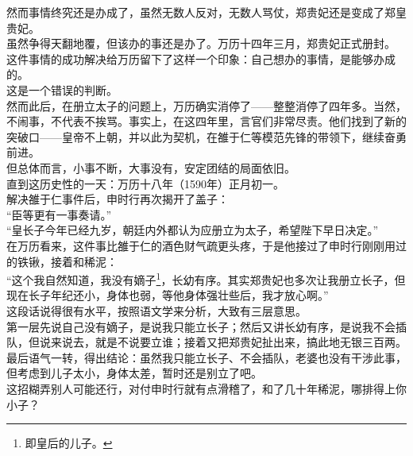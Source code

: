 \begin{multicols}{\theparacolNo}
然而事情终究还是办成了，虽然无数人反对，无数人骂仗，郑贵妃还是变成了郑皇贵妃。\\

虽然争得天翻地覆，但该办的事还是办了。万历十四年三月，郑贵妃正式册封。\\

这件事情的成功解决给万历留下了这样一个印象：自己想办的事情，是能够办成的。\\

这是一个错误的判断。\\

然而此后，在册立太子的问题上，万历确实消停了——整整消停了四年多。当然，不闹事，不代表不挨骂。事实上，在这四年里，言官们非常尽责。他们找到了新的突破口——皇帝不上朝，并以此为契机，在雒于仁等模范先锋的带领下，继续奋勇前进。\\

但总体而言，小事不断，大事没有，安定团结的局面依旧。\\

直到这历史性的一天：万历十八年（1590年）正月初一。\\

解决雒于仁事件后，申时行再次揭开了盖子：\\

“臣等更有一事奏请。”\\

“皇长子今年已经九岁，朝廷内外都认为应册立为太子，希望陛下早日决定。”\\

在万历看来，这件事比雒于仁的酒色财气疏更头疼，于是他接过了申时行刚刚用过的铁锹，接着和稀泥：\\

“这个我自然知道，我没有嫡子\footnote{即皇后的儿子。}，长幼有序。其实郑贵妃也多次让我册立长子，但现在长子年纪还小，身体也弱，等他身体强壮些后，我才放心啊。”\\

这段话说得很有水平，按照语文学来分析，大致有三层意思。\\

第一层先说自己没有嫡子，是说我只能立长子；然后又讲长幼有序，是说我不会插队，但说来说去，就是不说要立谁；接着又把郑贵妃扯出来，搞此地无银三百两。\\

最后语气一转，得出结论：虽然我只能立长子、不会插队，老婆也没有干涉此事，但考虑到儿子太小，身体太差，暂时还是别立了吧。\\

这招糊弄别人可能还行，对付申时行就有点滑稽了，和了几十年稀泥，哪排得上你小子？\\


\end{multicols}
